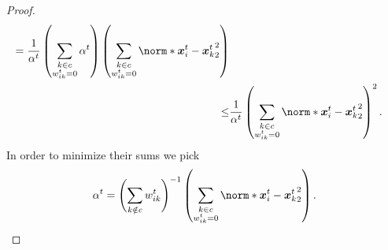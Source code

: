 \documentclass{article}
\begin{document}
\begin{proof}
\begin{align*}
    = \frac{1}{\alpha^t}\left(\sum_{\substack{k\in c \\ w_{ik}^t=0}} \alpha^t\right) \left(\sum_{\substack{k\in c \\ w_{ik}^t=0}} \norm*{ \xx_i^t - \xx_k^t}_2^2 \right) \\
    \le& \frac{1}{\alpha^t}\left(\sum_{\substack{k\in c \\ w_{ik}^t=0}} \norm*{ \xx_i^t - \xx_k^t}_2^2 \right)^2.
  \end{align*}
  In order to minimize their sums we pick
  \begin{align*}
    \alpha^t = \left(\sum_{k\notin c} w_{ik}^t\right)^{-1} \left(\sum_{\substack{k\in c \\ w_{ik}^t=0}} \norm*{ \xx_i^t - \xx_k^t}_2^2 \right).
  \end{align*}
\end{proof}

 
\end{document}
